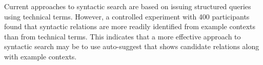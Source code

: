 
Current approaches to syntactic search are based on issuing structured queries using technical terms. However, a controlled experiment with 400 participants found that syntactic relations are more readily identified from example contexts than from technical terms. This indicates that a more effective approach to syntactic search may be to use auto-suggest that shows candidate relations along with example contexts.
